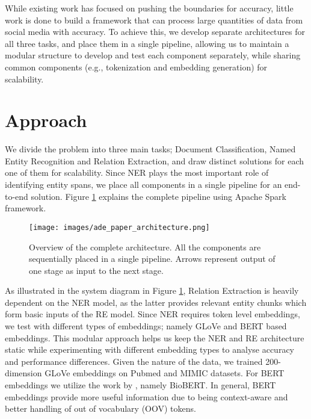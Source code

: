 \documentclass[letterpaper]{article}
\begin{document}
While existing work has focused on pushing the boundaries for accuracy, little work is done to build a framework that can process large quantities of data from social media with accuracy. To achieve this, we develop separate architectures for all three tasks, and place them in a single pipeline, allowing us to maintain a modular structure to develop and test each component separately, while sharing common components (e.g., tokenization and embedding generation) for scalability. 

\section{Approach}
We divide the problem into three main tasks; Document Classification, Named Entity Recognition and Relation Extraction, and draw distinct solutions for each one of them for scalability. Since NER plays the most important role of identifying entity spans, we place all components in a single pipeline for an end-to-end solution. Figure \ref{fig:basic_pp} explains the complete pipeline using Apache Spark framework.

\begin{figure}[h!]
  \texttt{[image: images/ade\_paper\_architecture.png]}
  \caption{Overview of the complete architecture. All the components are sequentially placed in a single pipeline. Arrows represent output of one stage as input to the next stage.}
  \label{fig:basic_pp}
\end{figure}

As illustrated in the system diagram in Figure \ref{fig:basic_pp}, Relation Extraction is heavily dependent on the NER model, as the latter provides relevant entity chunks which form basic inputs of the RE model. Since NER requires token level embeddings, we test with different types of embeddings; namely GLoVe \cite{pennington-etal-2014-glove} and BERT \cite{DBLP:journals/corr/abs-1810-04805} based embeddings. This modular approach helps us keep the NER and RE architecture static while experimenting with different embedding types to analyse accuracy and performance differences. Given the nature of the data, we trained 200-dimension GLoVe embeddings on Pubmed and MIMIC datasets. For BERT embeddings we utilize the work by \cite{DBLP:journals/corr/abs-1901-08746}, namely BioBERT. In general, BERT  embeddings provide more useful information due to being context-aware and better handling of out of vocabulary (OOV) tokens.
\end{document}
